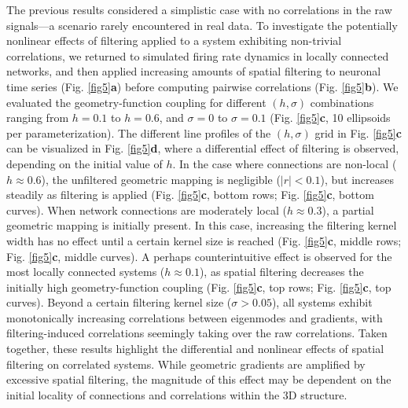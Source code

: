 \documentclass{article}
\begin{document}
The previous results considered a simplistic case with no correlations in the raw signals---a scenario rarely encountered in real data. To investigate the potentially nonlinear effects of filtering applied to a system exhibiting non-trivial correlations, we returned to simulated firing rate dynamics in locally connected networks, and then applied increasing amounts of spatial filtering to neuronal time series (Fig. \ref{fig5}\textbf{a}) before computing pairwise correlations (Fig. \ref{fig5}\textbf{b}). We evaluated the geometry-function coupling for different $(h, \sigma)$ combinations ranging from $h=0.1$ to $h=0.6$, and $\sigma=0$ to $\sigma=0.1$ (Fig. \ref{fig5}\textbf{c}, 10 ellipsoids per parameterization). The different line profiles of the $(h, \sigma)$ grid in Fig. \ref{fig5}\textbf{c} can be visualized in Fig. \ref{fig5}\textbf{d}, where a differential effect of filtering is observed, depending on the initial value of $h$. In the case where connections are non-local ($h\approx0.6$), the unfiltered geometric mapping is negligible ($|r|<0.1$), but increases steadily as filtering is applied (Fig. \ref{fig5}\textbf{c}, bottom rows; Fig. \ref{fig5}\textbf{c}, bottom curves). When network connections are moderately local ($h\approx0.3$), a partial geometric mapping is initially present. In this case, increasing the filtering kernel width has no effect until a certain kernel size is reached (Fig. \ref{fig5}\textbf{c}, middle rows; Fig. \ref{fig5}\textbf{c}, middle curves). A perhaps counterintuitive effect is observed for the most locally connected systems ($h\approx0.1$), as spatial filtering decreases the initially high geometry-function coupling (Fig. \ref{fig5}\textbf{c}, top rows; Fig. \ref{fig5}\textbf{c}, top curves). Beyond a certain filtering kernel size ($\sigma>0.05$), all systems exhibit monotonically increasing correlations between eigenmodes and gradients, with filtering-induced correlations seemingly taking over the raw correlations. Taken together, these results highlight the differential and nonlinear effects of spatial filtering on correlated systems. While geometric gradients are amplified by excessive spatial filtering, the magnitude of this effect may be dependent on the initial locality of connections and correlations within the 3D structure.
\end{document}
